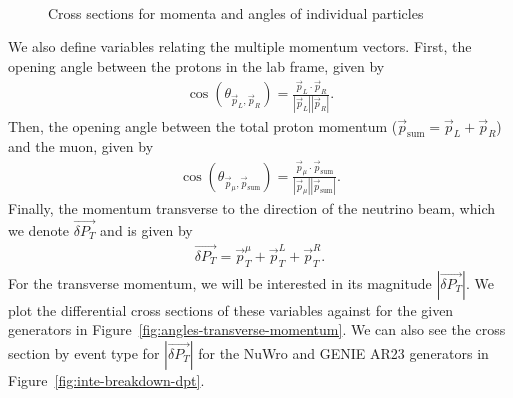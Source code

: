 \documentclass{article}
\newcommand{\vm}{\vec{p}_\mu}
\newcommand{\vlp}{\vec{p}_L}
\newcommand{\vrp}{\vec{p}_R}
\newcommand{\vtp}{\vec{p}_{\text{sum}}}
\newcommand{\vdp}{\vec{\delta P_T}}
\begin{document}
\begin{figure}
     \\
    \caption{Cross sections for momenta and angles of individual particles}
    \label{fig:momenta-cos-theta}
\end{figure}

We also define variables relating the multiple momentum vectors. First, the opening angle between the protons in the lab frame,
given by 
\begin{align}
    \cos\left(\theta_{\vlp,\vrp}\right) = \frac{\vlp \cdot \vrp}{|\vlp||\vrp|}.
\end{align}
Then, the opening angle between the total proton momentum ($\vtp = \vlp + \vrp$) and the 
muon, given by 
\begin{align}
    \cos\left(\theta_{\vm,\vtp}\right) = \frac{\vm \cdot \vtp}{|\vm||\vtp|}.
\end{align}
Finally, the momentum transverse to the direction of the neutrino beam, which we denote $\vdp$ and is given by 
\begin{align}
    \vdp = \vec{p}^{\mu}_T + \vec{p}^{L}_T + \vec{p}^{R}_T.
\end{align}
For the transverse momentum, we will be interested in its magnitude $|\vdp|$. We plot the differential cross sections of these variables against for the given generators in Figure~\ref{fig:angles-transverse-momentum}. We can also see the cross section by event type for $|\vdp|$ for the NuWro and GENIE AR23 generators in Figure~\ref{fig:inte-breakdown-dpt}.
\end{document}
